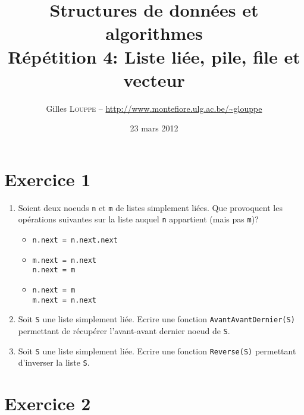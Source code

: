 \documentclass[a4paper,10pt]{article}
\title{
    \textbf{Structures de données et algorithmes}\\
    Répétition 4: Liste liée, pile, file et vecteur
}
\author{Gilles \textsc{Louppe} -- \url{http://www.montefiore.ulg.ac.be/~glouppe}}
\date{23 mars 2012}
\begin{document}
\maketitle

\section*{Exercice 1}

\begin{enumerate}

\item Soient deux noeuds \texttt{n} et \texttt{m} de listes simplement liées. Que provoquent les opérations suivantes sur la liste auquel \texttt{n} appartient (mais pas \texttt{m})?

\begin{itemize}

\item
\begin{verbatim}
n.next = n.next.next
\end{verbatim}

\item
\begin{verbatim}
m.next = n.next
n.next = m
\end{verbatim}

\item
\begin{verbatim}
n.next = m
m.next = n.next
\end{verbatim}

\end{itemize}

\item Soit \texttt{S} une liste simplement liée. Ecrire une fonction \texttt{AvantAvantDernier(S)} permettant de récupérer l'avant-avant dernier noeud de \texttt{S}.

\item Soit \texttt{S} une liste simplement liée. Ecrire une fonction \texttt{Reverse(S)} permettant d'inverser la liste \texttt{S}.

\end{enumerate}

\section*{Exercice 2}
\end{document}
